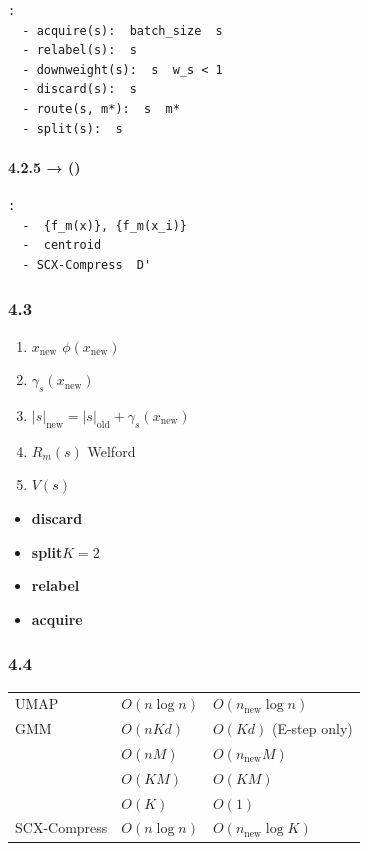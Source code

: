 \documentclass[
  12pt,
]{article}
\providecommand{\tightlist}{%
  \setlength{\itemsep}{0pt}\setlength{\parskip}{0pt}}
\begin{document}
\begin{verbatim}
:
  - acquire(s):  batch_size  s 
  - relabel(s):  s 
  - downweight(s):  s  w_s < 1
  - discard(s):  s
  - route(s, m*):  s  m*
  - split(s):  s 
\end{verbatim}



\paragraph{4.2.5  → 
()}\label{ux6a21ux578bux66f4ux65b0ux6a21ux5757-ux72b6ux6001ux6784ux9020ux5f15ux64ce-ux53cdux9988ux95edux73af}

\begin{verbatim}
:
  -  {f_m(x)}, {f_m(x_i)}
  -  centroid 
  - SCX-Compress  D'
\end{verbatim}

\subsubsection{4.3
}\label{ux95edux73afux66f4ux65b0ux903bux8f91}

\textbf{}

\begin{enumerate}
\def\labelenumi{\arabic{enumi}.}
\tightlist
\item
   \(x_{\text{new}}\)  \(\phi(x_{\text{new}})\)
\item
   \(\gamma_s(x_{\text{new}})\)
\item
  \(|s|_{\text{new}} = |s|_{\text{old}} + \gamma_s(x_{\text{new}})\)
\item
   \(R_m(s)\) Welford 
\item
   \(V(s)\)
\end{enumerate}

\textbf{}

\begin{itemize}
\tightlist
\item
  \textbf{discard}
\item
  \textbf{split}\(K=2\)
\item
  \textbf{relabel}
\item
  \textbf{acquire}
\end{itemize}

\subsubsection{4.4
}\label{ux8ba1ux7b97ux590dux6742ux5ea6ux5206ux6790}

\begin{longtable}[]{@{}lll@{}}
\toprule\noalign{}
 &  &  \\
\midrule\noalign{}
\endhead
\bottomrule\noalign{}
\endlastfoot
UMAP  & \(O(n \log n)\) & \(O(n_{\text{new}} \log n)\) \\
GMM  & \(O(n K d)\) & \(O(K d)\) (E-step only) \\
 & \(O(n M)\) & \(O(n_{\text{new}} M)\) \\
 & \(O(K M)\) & \(O(K M)\) \\
 & \(O(K)\) & \(O(1)\) \\
SCX-Compress & \(O(n \log n)\) & \(O(n_{\text{new}} \log K)\) \\
\end{longtable}
\end{document}

